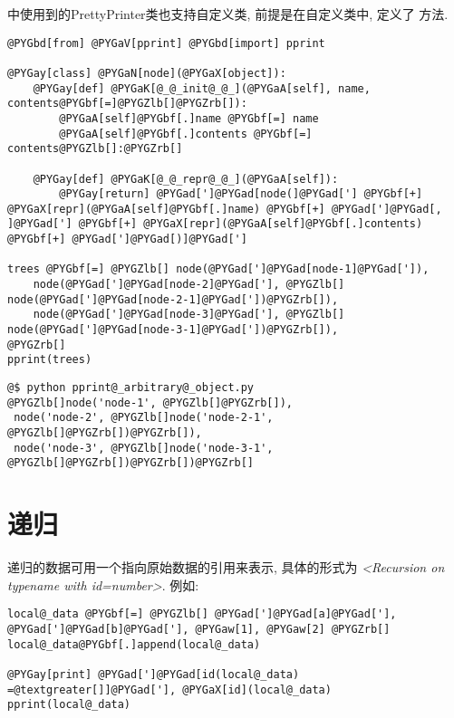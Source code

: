\documentclass[a4paper,10pt,english]{manual}
\begin{document}
 中使用到的PrettyPrinter类也支持自定义类, 前提是在自定义类中, 定义了  方法.

\begin{Verbatim}[commandchars=@\[\]]
@PYGbd[from] @PYGaV[pprint] @PYGbd[import] pprint

@PYGay[class] @PYGaN[node](@PYGaX[object]):
    @PYGay[def] @PYGaK[@_@_init@_@_](@PYGaA[self], name, contents@PYGbf[=]@PYGZlb[]@PYGZrb[]):
        @PYGaA[self]@PYGbf[.]name @PYGbf[=] name
        @PYGaA[self]@PYGbf[.]contents @PYGbf[=] contents@PYGZlb[]:@PYGZrb[]

    @PYGay[def] @PYGaK[@_@_repr@_@_](@PYGaA[self]):
        @PYGay[return] @PYGad[']@PYGad[node(]@PYGad['] @PYGbf[+] @PYGaX[repr](@PYGaA[self]@PYGbf[.]name) @PYGbf[+] @PYGad[']@PYGad[, ]@PYGad['] @PYGbf[+] @PYGaX[repr](@PYGaA[self]@PYGbf[.]contents) @PYGbf[+] @PYGad[']@PYGad[)]@PYGad[']

trees @PYGbf[=] @PYGZlb[] node(@PYGad[']@PYGad[node-1]@PYGad[']),
    node(@PYGad[']@PYGad[node-2]@PYGad['], @PYGZlb[] node(@PYGad[']@PYGad[node-2-1]@PYGad['])@PYGZrb[]),
    node(@PYGad[']@PYGad[node-3]@PYGad['], @PYGZlb[] node(@PYGad[']@PYGad[node-3-1]@PYGad['])@PYGZrb[]),
@PYGZrb[]
pprint(trees)
\end{Verbatim}

\begin{Verbatim}[commandchars=@\[\]]
@$ python pprint@_arbitrary@_object.py
@PYGZlb[]node('node-1', @PYGZlb[]@PYGZrb[]),
 node('node-2', @PYGZlb[]node('node-2-1', @PYGZlb[]@PYGZrb[])@PYGZrb[]),
 node('node-3', @PYGZlb[]node('node-3-1', @PYGZlb[]@PYGZrb[])@PYGZrb[])@PYGZrb[]
\end{Verbatim}


\section{递归}

递归的数据可用一个指向原始数据的引用来表示, 具体的形式为 \emph{\textless{}Recursion on typename with id=number\textgreater{}}. 例如:

\begin{Verbatim}[commandchars=@\[\]]
local@_data @PYGbf[=] @PYGZlb[] @PYGad[']@PYGad[a]@PYGad['], @PYGad[']@PYGad[b]@PYGad['], @PYGaw[1], @PYGaw[2] @PYGZrb[]
local@_data@PYGbf[.]append(local@_data)

@PYGay[print] @PYGad[']@PYGad[id(local@_data) =@textgreater[]]@PYGad['], @PYGaX[id](local@_data)
pprint(local@_data)
\end{Verbatim}
\end{document}
